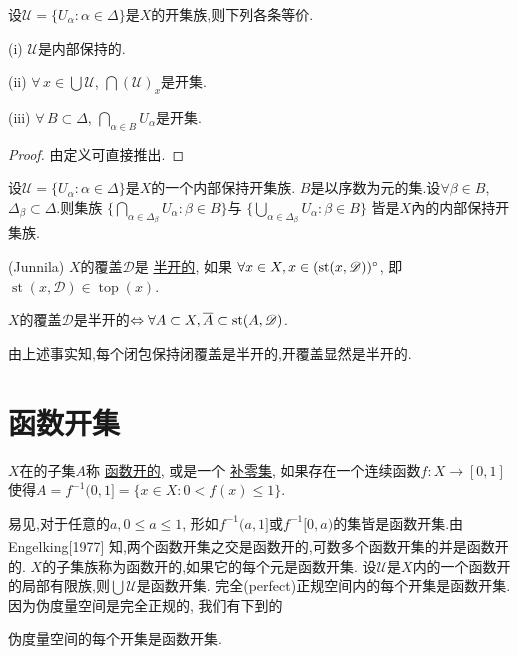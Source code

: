 \documentclass[main.tex]{subfiles}
\begin{document}
\begin{fact} \label{fact:1.3.2}
设$\mathscr{U}=\{U_\alpha:\alpha\in\Delta\}$是$X$的开集族,则下列各条等价.

(i) $\mathscr{U}$是内部保持的.

(ii) $\forall \, x\in\bigcup\mathscr{U}$, $\bigcap(\mathscr{U})_x$是开集.

(iii) $\forall \, B\subset\Delta$, $\bigcap_{\alpha\in B}U_\alpha$是开集.
\end{fact}
\begin{proof}
由定义可直接推出.
\end{proof}

\begin{fact} \label{fact:1.3.3}
设$\mathscr{U}=\{U_\alpha:\alpha\in\Delta\}$是$X$的一个内部保持开集族.
$B$是以序数为元的集.设$\forall \beta\in B$, $\Delta_\beta\subset \Delta$.则集族
$\{\bigcap_{\alpha\in\Delta_\beta}U_\alpha: \beta\in B\}$与
$\{\bigcup_{\alpha\in\Delta_\beta}U_\alpha: \beta\in B\}$
皆是$X$內的内部保持开集族.
\end{fact}

\begin{definition} \label{def:1.3.4}
\textnormal{(Junnila)} $X$的覆盖$\mathscr{D}$是
\underline{半开的},
如果
$\forall x\in X, x\in(\textnormal{st}(x, \mathscr{D}))^\circ$, 
即 $\operatorname{st}(x, \mathscr{D})\in \operatorname{top}(x)$.
\end{definition}

\begin{fact} \label{fact:1.3.5}
$X$的覆盖$\mathscr{D}$是半开的$\Leftrightarrow \forall A\subset X, \overline{A} \subset\textnormal{st}(A, \mathscr{D})$. 
\end{fact}

由上述事实知,每个闭包保持闭覆盖是半开的,开覆盖显然是半开的.


\section{函数开集}\label{sec:1.4}

\begin{definition} \label{def:1.4.1}
$X$在的子集$A$称
\underline{函数开的},
或是一个
\underline{补零集},
如果存在一个连续函数$f:X\rightarrow [0,1]$使得$A=f^{-1}(0,1]=\{x\in X: 0<f(x)\le 1\}$.
\end{definition}

易见,对于任意的$a, 0\le a\le1$, 形如$f^{-1}(a,1]$或$f^{-1}[0,a)$的集皆是函数开集.由 Engelking[1977]\textsuperscript{\cite{Engelking1977}}
知,两个函数开集之交是函数开的,可数多个函数开集的并是函数开的.
$X$的子集族称为函数开的,如果它的每个元是函数开集.
设$\mathscr{U}$是$X$内的一个函数开的局部有限族,则$\bigcup \mathscr{U}$是函数开集.
完全(perfect)正规空间内的每个开集是函数开集.
因为伪度量空间是完全正规的, 我们有下到的

\begin{fact} \label{fact:1.4.2}
伪度量空间的每个开集是函数开集.
\end{fact}
\end{document}
